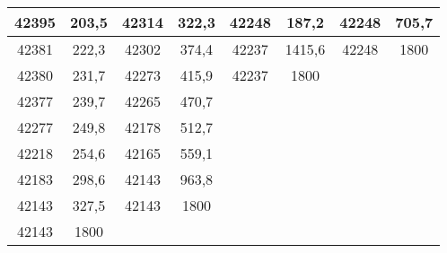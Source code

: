 \documentclass[11pt]{article}
\begin{document}
{{\begin{tabular}{|c|c|c|c|c|c|c|c|}
            \hline 
            42395 & 203,5 & 42314 & 322,3 & 42248 & 187,2 & 42248 & 705,7\tabularnewline
            \hline 
            42381 & 222,3 & 42302 & 374,4 & 42237 & 1415,6 & 42248 & 1800\tabularnewline
            \hline 
            42380 & 231,7 & 42273 & 415,9 & 42237 & 1800 & \multicolumn{1}{c}{} & \multicolumn{1}{c}{}\tabularnewline
            \cline{1-6} 
            42377 & 239,7 & 42265 & 470,7 & \multicolumn{1}{c}{} & \multicolumn{1}{c}{} & \multicolumn{1}{c}{} & \multicolumn{1}{c}{}\tabularnewline
            \cline{1-4} 
            42277 & 249,8 & 42178 & 512,7 & \multicolumn{1}{c}{} & \multicolumn{1}{c}{} & \multicolumn{1}{c}{} & \multicolumn{1}{c}{}\tabularnewline
            \cline{1-4} 
            42218 & 254,6 & 42165 & 559,1 & \multicolumn{1}{c}{} & \multicolumn{1}{c}{} & \multicolumn{1}{c}{} & \multicolumn{1}{c}{}\tabularnewline
            \cline{1-4} 
            42183 & 298,6 & 42143 & 963,8 & \multicolumn{1}{c}{} & \multicolumn{1}{c}{} & \multicolumn{1}{c}{} & \multicolumn{1}{c}{}\tabularnewline
            \cline{1-4} 
            42143 & 327,5 & 42143 & 1800 & \multicolumn{1}{c}{} & \multicolumn{1}{c}{} & \multicolumn{1}{c}{} & \multicolumn{1}{c}{}\tabularnewline
            \cline{1-4} 
            42143 & 1800 & \multicolumn{1}{c}{} & \multicolumn{1}{c}{} & \multicolumn{1}{c}{} & \multicolumn{1}{c}{} & \multicolumn{1}{c}{} & \multicolumn{1}{c}{}\tabularnewline
            \cline{1-2} 
        \end{tabular}
    }
}
\vspace*{\fill}
\end{document}
